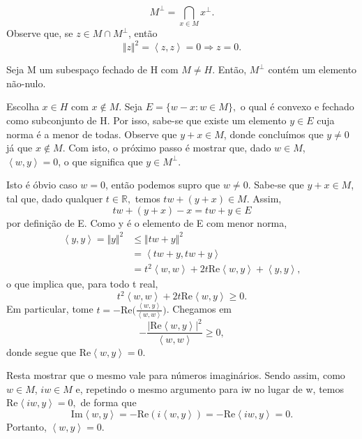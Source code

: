 \documentclass[measure_theory.tex]{subfiles}
\begin{document}
\[
	M^{\perp } = \bigcap_{x\in M}^{}x^{\perp }.
\]
Observe que, se \(z\in M\cap M^{\perp }\), então
\[
	\Vert z \Vert^{2} = \left< z, z \right> = 0 \Rightarrow z = 0.
\]
\begin{lemma*}
	Seja M um subespaço fechado de H com \(M\neq H\). Então, \(M^{\perp }\) contém um elemento não-nulo.
\end{lemma*}
\begin{proof*}
	Escolha \(x\in H\) com \(x\not\in M\). Seja \(E = \{w - x: w\in M\},\) o qual é convexo e fechado como subconjunto de H. Por isso, sabe-se que existe um elemento \(y\in E\) cuja norma
	é a menor de todas. Observe que \(y+x\in M\), donde concluímos que \(y\neq 0\) já que \(x\not\in M\). Com isto, o próximo passo é mostrar que, dado \(w\in M\), \(\left< w, y \right> = 0\), o que
	significa que \(y\in M^{\perp }\).

	Isto é óbvio caso \(w = 0\), então podemos supro que \(w\neq 0.\) Sabe-se que \(y+x\in M\), tal que, dado qualquer \(t\in \mathbb{R},\) temos \(tw + (y+x)\in M\). Assim,
	\[
		tw + (y+x) - x = tw + y\in E
	\]
	por definição de E. Como y é o elemento de E com menor norma,
	\begin{align*}
		\left< y, y \right> = \Vert y \Vert^{2} & \leq \Vert tw+y \Vert^{2}                                                             \\
		                                        & = \left< tw + y, tw + y \right>                                                       \\
		                                        & = t^{2}\left< w, w \right> + 2t \mathrm{Re}\left< w, y \right> + \left< y, y \right>,
	\end{align*}
	o que implica que, para todo t real,
	\[
		t^{2}\left< w, w \right> + 2t \mathrm{Re}\left< w, y \right>\geq 0.
	\]
	Em particular, tome \(t = -\mathrm{Re}\biggl(\frac{\left< w, y \right>}{\left< w, w \right>}\biggr)\). Chegamos em
	\[
		-\frac{|\mathrm{Re}\left< w, y \right>|^{2}}{\left< w, w \right>}\geq 0,
	\]
	donde segue que \(\mathrm{Re}\left< w, y \right> = 0\).

	Resta mostrar que o mesmo vale para números imaginários. Sendo assim, como \(w\in M\), \(iw\in M\) e, repetindo o mesmo argumento para iw no lugar de w, temos \(\mathrm{Re}\left< iw, y \right> = 0,\) de forma que
	\[
		\mathrm{Im}\left< w, y \right> = - \mathrm{Re}(i \left< w, y \right>) = -\mathrm{Re}\left< iw, y \right> = 0.
	\]
	Portanto, \(\left< w, y \right> = 0\). \qedsymbol
\end{proof*}
\end{document}
